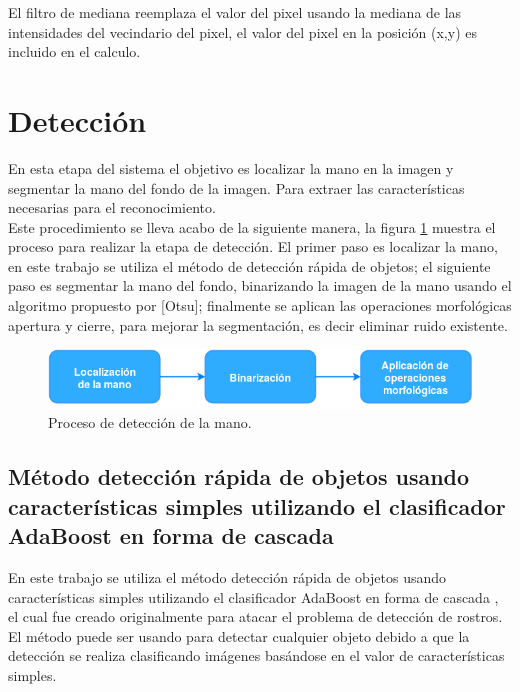 El filtro de mediana reemplaza el valor del pixel usando la mediana de las intensidades del vecindario del pixel, el valor del pixel en la posición (x,y) es incluido en el calculo. 
 



\section{Detección}\label{sec:Detection}

En esta etapa del sistema el objetivo es localizar la mano en la imagen y segmentar la mano del fondo de la imagen. Para extraer las características necesarias para el reconocimiento.\\
Este procedimiento se lleva acabo de la siguiente manera, la figura \ref{fig:ProcesoDeteccion} muestra el proceso para  realizar la etapa de detección. El primer paso es localizar la mano, en este trabajo se utiliza el método de detección rápida de objetos; el siguiente paso es segmentar la mano del fondo, binarizando la imagen de la mano usando el algoritmo propuesto por [Otsu]; finalmente se aplican las operaciones morfológicas apertura y cierre, para mejorar la segmentación, es decir eliminar ruido existente. 

\begin{figure}[h!]
\begin{center}
\includegraphics[scale=.7]{./Figures/Detection.png}
\end{center}
\caption{Proceso de detección de la mano.}
\label{fig:ProcesoDeteccion}
\end{figure} 

\subsection{Método detección rápida de objetos usando características simples utilizando el clasificador AdaBoost en forma de cascada}\label{subsec:ViolaJones}

En este trabajo se utiliza el método detección rápida de objetos usando características simples utilizando el clasificador AdaBoost en forma de cascada \citep{Viola2001}, el cual fue creado originalmente para atacar el problema de detección de rostros. El método puede ser usando para detectar cualquier objeto debido a que la detección se realiza clasificando imágenes basándose en el valor de características simples.

